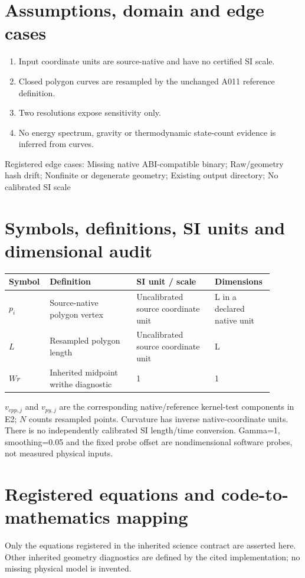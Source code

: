 \documentclass[10pt,a4paper]{article}
\begin{document}
\section{Assumptions, domain and edge cases}
\begin{enumerate}\item Input coordinate units are source-native and have no certified SI scale.
\item Closed polygon curves are resampled by the unchanged A011 reference definition.
\item Two resolutions expose sensitivity only.
\item No energy spectrum, gravity or thermodynamic state-count evidence is inferred from curves.\end{enumerate}
Registered edge cases: Missing native ABI-compatible binary; Raw/geometry hash drift; Nonfinite or degenerate geometry; Existing output directory; No calibrated SI scale
\section{Symbols, definitions, SI units and dimensional audit}
\begin{longtable}{p{0.11\linewidth}p{0.31\linewidth}p{0.29\linewidth}p{0.18\linewidth}}\toprule Symbol & Definition & SI unit / scale & Dimensions\\\midrule
$p_i$ & Source-native polygon vertex & Uncalibrated source coordinate unit & L in a declared native unit \\
$L$ & Resampled polygon length & Uncalibrated source coordinate unit & L \\
$Wr$ & Inherited midpoint writhe diagnostic & 1 & 1 \\
\bottomrule\end{longtable}
$v_{cpp,j}$ and $v_{py,j}$ are the corresponding native/reference kernel-test components in E2; $N$ counts resampled points. Curvature has inverse native-coordinate units. There is no independently calibrated SI length/time conversion. Gamma=1, smoothing=0.05 and the fixed probe offset are nondimensional software probes, not measured physical inputs.
\section{Registered equations and code-to-mathematics mapping}

Only the equations registered in the inherited science contract are asserted here. Other inherited geometry diagnostics are defined by the cited implementation; no missing physical model is invented.
\end{document}
